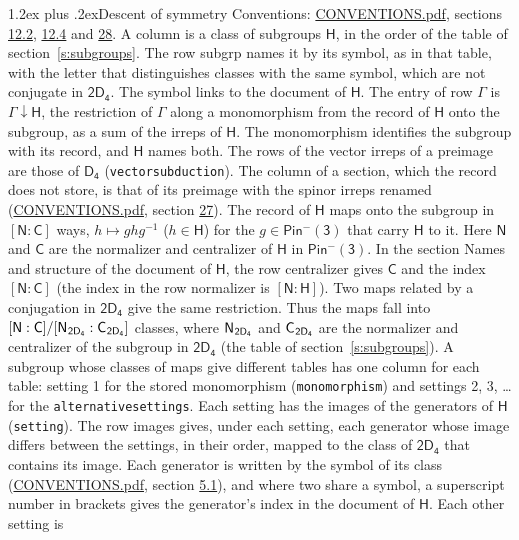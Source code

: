 \documentclass[10pt,a4paper]{article}
\makeatletter
\renewcommand\section{\@startsection{section}{1}{\z@}{-3ex plus -1ex minus -.2ex}%
  {1.2ex plus .2ex}{\normalfont\large\sffamily\bfseries\color{parttitle}}}
\numberwithin{equation}{section}
\newcommand{\grp}[1]{\mathsf{#1}}
\newcommand{\grpindex}[2]{[#1 : #2]}
\newcommand{\restr}[2]{#1\!\downarrow#2}
\newcommand{\hairsp}{\mkern1mu}
\makeatother
\begin{document}
\section{Descent of symmetry}\label{s:subduction}
Conventions: \href{../../CONVENTIONS.pdf}{CONVENTIONS.pdf}, sections \href{../../../rotation/CONVENTIONS.pdf\#conv.12.2}{12.2}, \href{../../../rotation/CONVENTIONS.pdf\#conv.12.4}{12.4} and \href{../../CONVENTIONS.pdf\#conv.28}{28}.
A column is a class of subgroups $\grp{H}$, in the order of the table of section~\ref{s:subgroups}. The row subgrp names it by its symbol, as in that table, with the letter that distinguishes classes with the same symbol, which are not conjugate in $\grp{2D_{4}}$. The symbol links to the document of $\grp{H}$. The entry of row $\Gamma$ is $\restr{\Gamma}{\grp{H}}$, the restriction of $\Gamma$ along a monomorphism from the record of $\grp{H}$ onto the subgroup, as a sum of the irreps of $\grp{H}$. The monomorphism identifies the subgroup with its record, and $\grp{H}$ names both. The rows of the vector irreps of a preimage are those of \href{../../../rotation/data/pdf/D4.pdf}{$\grp{D_{4}}$} (\texttt{vectorsubduction}). The column of a section, which the record does not store, is that of its preimage with the spinor irreps renamed (\href{../../CONVENTIONS.pdf}{CONVENTIONS.pdf}, section \href{../../CONVENTIONS.pdf\#conv.27}{27}). \label{n:group.normalizer.o3}\label{n:group.centralizer.o3}\label{n:element.h}The record of $\grp{H}$ maps onto the subgroup in $\grpindex{\grp{N}}{\grp{C}}$ ways, $h \mapsto g h g^{-1}$ ($h \in \grp{H}$) for the $g \in \grp{Pin^{-}(3)}$ that carry $\grp{H}$ to it. Here $\grp{N}$ and $\grp{C}$ are the normalizer and centralizer of $\grp{H}$ in \href{Pinminus3.pdf}{$\grp{Pin^{-}(3)}$}. In the section Names and structure of the document of $\grp{H}$, the row centralizer gives $\grp{C}$ and the index $\grpindex{\grp{N}}{\grp{C}}$ (the index in the row normalizer is $\grpindex{\grp{N}}{\grp{H}}$). Two maps related by a conjugation in $\grp{2D_{4}}$ give the same restriction. Thus the maps fall into $\grpindex{\grp{N}}{\grp{C}}/\grpindex{\grp{N}_{\hairsp \grp{2D_{4}}}}{\grp{C}_{\hairsp \grp{2D_{4}}}}$ classes, where $\grp{N}_{\hairsp \grp{2D_{4}}}$ and $\grp{C}_{\hairsp \grp{2D_{4}}}$ are the normalizer and centralizer of the subgroup in $\grp{2D_{4}}$ (the table of section~\ref{s:subgroups}). \label{n:head.setting}A subgroup whose classes of maps give different tables has one column for each table: setting 1 for the stored monomorphism (\texttt{monomorphism}) and settings 2, 3, \dots{} for the \texttt{alternativesettings}. Each setting has the images of the generators of $\grp{H}$ (\texttt{setting}). \label{n:head.images}The row images gives, under each setting, each generator whose image differs between the settings, in their order, mapped to the class of $\grp{2D_{4}}$ that contains its image. \label{n:element.generator.index}Each generator is written by the symbol of its class (\href{../../CONVENTIONS.pdf}{CONVENTIONS.pdf}, section \href{../../../rotation/CONVENTIONS.pdf\#conv.5.1}{5.1}), and where two share a symbol, a superscript number in brackets gives the generator's index in the document of $\grp{H}$. \label{n:irrep.Delta}Each other setting is 
\end{document}
